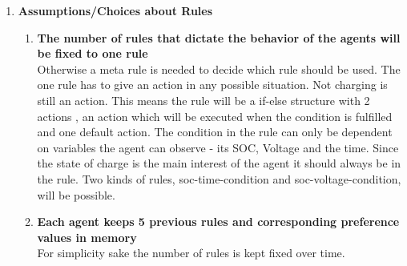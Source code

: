 \documentclass[a4paper]{article}
\begin{document}
\begin{enumerate}
 \item \textbf{Assumptions/Choices  about Rules} \begin{enumerate}
                                         \item \textbf{The number of rules that dictate the behavior of the agents will be 
                                         fixed to one rule} \\
                                         Otherwise a meta rule is needed to decide which rule should be used. 
					 The one rule has to give an action in any possible situation. Not charging is still
					 an action. This means the rule will be a if-else structure with 2 actions , 
					 an action which will be executed when the condition is fulfilled and one default 
					 action.
					 The condition in the rule can only be dependent on variables the agent can observe - 
					 its SOC, Voltage and the time. Since the state of charge is the main interest of the
					 agent it should always be in the rule. Two kinds of rules, soc-time-condition and 
					 soc-voltage-condition, will be possible.
					 \item \textbf{Each agent keeps  5 previous rules and corresponding preference 
					 values in memory }\\
					 For simplicity sake the number of rules is kept fixed over time.
					 
					 \end{enumerate}
					 

\end{enumerate}
\end{document}
